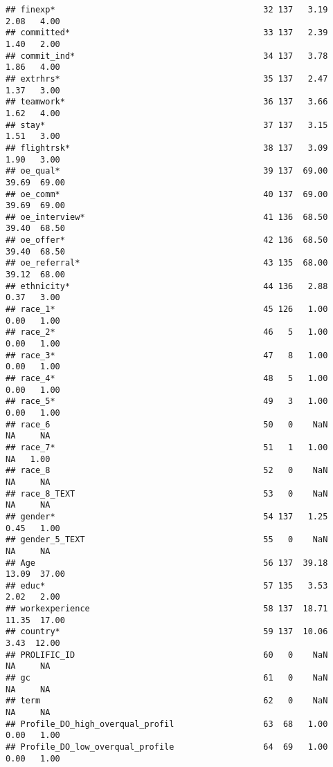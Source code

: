 \documentclass[]{article}
\begin{document}
\begin{verbatim}
## finexp*                                          32 137   3.19   2.08   4.00
## committed*                                       33 137   2.39   1.40   2.00
## commit_ind*                                      34 137   3.78   1.86   4.00
## extrhrs*                                         35 137   2.47   1.37   3.00
## teamwork*                                        36 137   3.66   1.62   4.00
## stay*                                            37 137   3.15   1.51   3.00
## flightrsk*                                       38 137   3.09   1.90   3.00
## oe_qual*                                         39 137  69.00  39.69  69.00
## oe_comm*                                         40 137  69.00  39.69  69.00
## oe_interview*                                    41 136  68.50  39.40  68.50
## oe_offer*                                        42 136  68.50  39.40  68.50
## oe_referral*                                     43 135  68.00  39.12  68.00
## ethnicity*                                       44 136   2.88   0.37   3.00
## race_1*                                          45 126   1.00   0.00   1.00
## race_2*                                          46   5   1.00   0.00   1.00
## race_3*                                          47   8   1.00   0.00   1.00
## race_4*                                          48   5   1.00   0.00   1.00
## race_5*                                          49   3   1.00   0.00   1.00
## race_6                                           50   0    NaN     NA     NA
## race_7*                                          51   1   1.00     NA   1.00
## race_8                                           52   0    NaN     NA     NA
## race_8_TEXT                                      53   0    NaN     NA     NA
## gender*                                          54 137   1.25   0.45   1.00
## gender_5_TEXT                                    55   0    NaN     NA     NA
## Age                                              56 137  39.18  13.09  37.00
## educ*                                            57 135   3.53   2.02   2.00
## workexperience                                   58 137  18.71  11.35  17.00
## country*                                         59 137  10.06   3.43  12.00
## PROLIFIC_ID                                      60   0    NaN     NA     NA
## gc                                               61   0    NaN     NA     NA
## term                                             62   0    NaN     NA     NA
## Profile_DO_high_overqual_profil                  63  68   1.00   0.00   1.00
## Profile_DO_low_overqual_profile                  64  69   1.00   0.00   1.00

\end{verbatim}
\end{document}
